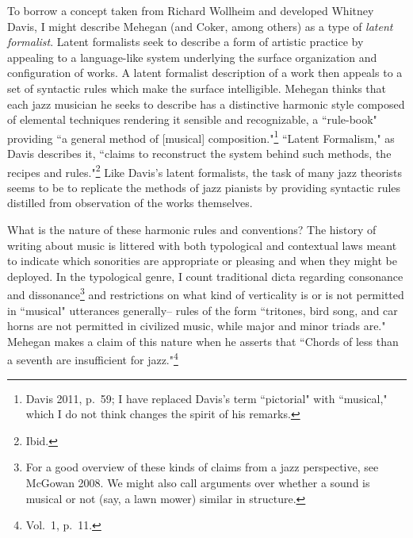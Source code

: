 To borrow a concept taken from Richard Wollheim and developed Whitney Davis, I might describe Mehegan (and Coker, among others) as a type of \emph{latent formalist}.  Latent formalists seek to describe a form of artistic practice by appealing to a language-like system underlying the surface organization and configuration of works.  A latent formalist description of a work then appeals to a set of syntactic rules which make the surface intelligible.  Mehegan thinks that each jazz musician he seeks to describe has a distinctive harmonic style composed of elemental techniques rendering it sensible and recognizable, a ``rule-book" providing ``a general method of [musical] composition."\footnote{Davis 2011, p.\ 59; I have replaced Davis's term ``pictorial" with ``musical," which I do not think changes the spirit of his remarks.}  ``Latent Formalism," as Davis describes it, ``claims to reconstruct the system behind such methods, the recipes and rules."\footnote{Ibid.}  Like Davis's latent formalists, the task of many jazz theorists seems to be to replicate the methods of jazz pianists by providing syntactic rules distilled from observation of the works themselves.

What is the nature of these harmonic rules and conventions?  The history of writing about music is littered with both typological and contextual laws meant to indicate which sonorities are appropriate or pleasing and when they might be deployed.  In the typological genre, I count traditional dicta regarding consonance and dissonance\footnote{For a good overview of these kinds of claims from a jazz perspective, see McGowan 2008.  We might also call arguments over whether a sound is musical or not (say, a lawn mower) similar in structure.} and restrictions on what kind of verticality is or is not permitted in ``musical" utterances generally-- rules of the form ``tritones, bird song, and car horns are not permitted in civilized music, while major and minor triads are."  Mehegan makes a claim of this nature when he asserts that ``Chords of less than a seventh are insufficient for jazz."\footnote{Vol.\ 1, p.\ 11.}

